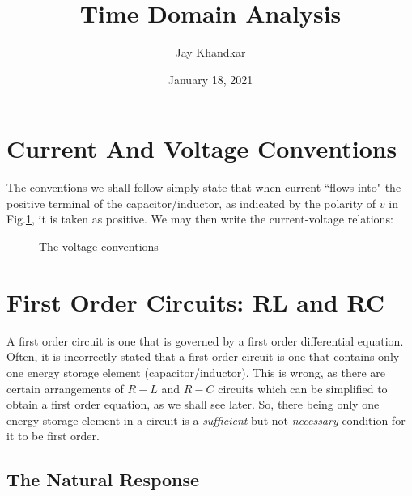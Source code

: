 \documentclass[12pt]{article}
\title{\textbf{Time Domain Analysis}}
\author{Jay Khandkar}
\date{January 18, 2021}
\numberwithin{equation}{section}
\newcommand*\widefbox[1]{\fbox{\hspace{2em}#1\hspace{2em}}}
\begin{document}
\maketitle
\newpage
\tableofcontents
\newpage
\begin{flushleft}
\color{blue}
\section{Current And Voltage Conventions}
\color{black}

The conventions we shall follow simply state that when 
current ``flows into" the positive terminal of the capacitor/inductor, as indicated by the polarity of $v$
in Fig.\ref{fig:conventions}, it is taken as positive. We may then write the current-voltage relations:


\begin{figure}[h!]
\centering
{}
\caption{The voltage conventions}
\label{fig:conventions}	
\end{figure}

\color{blue}
\section{First Order Circuits: RL and RC}
\color{black}
A first order circuit is one that is governed by a first order differential equation. Often, it is
incorrectly stated that a first order circuit is one that contains only one energy storage element
(capacitor/inductor). This is wrong, as there are certain arrangements of $R-L$ and $R-C$ circuits
which can be simplified to obtain a first order equation, as we shall see later. So, there being only
one energy storage element in a circuit is a \textit{sufficient} but not \textit{necessary} condition for
it to be first order.

\color{blue}
\subsection{The Natural Response}

\end{flushleft}
\end{document}
